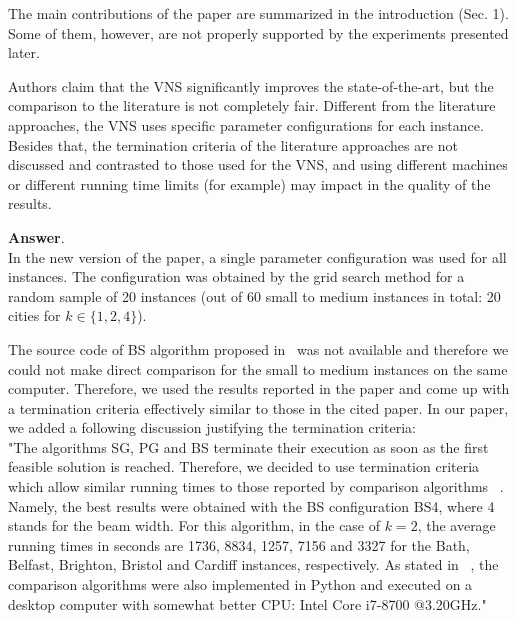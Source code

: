 \documentclass [11pt]{scrartcl}
\begin{document}
\begin{leftbar}
  
The main contributions of the paper are summarized in the introduction (Sec. 1). Some of them, however, are not properly supported by the experiments presented later.
\end{leftbar}
\begin{enumerate}
	\textbf{Answer}. \\
	In the new version of the paper, a single parameter configuration was used for all instances. The configuration was obtained by the grid search method for a random sample of 20 instances (out of 60 small to medium instances in total: 20 cities for $k \in \{1,2,4\}$).
	
	The source code of BS algorithm proposed in~\cite{corcoran2021heuristics} was not available and therefore we could not make direct comparison for the small to medium instances on the same computer. Therefore, we used the results reported in the paper and come up with a termination criteria effectively similar to those in the cited paper. 
	In our paper, we added a following discussion justifying the termination criteria:\\
	
	"The algorithms SG, PG and BS terminate their execution as soon as the first feasible solution is reached. Therefore, we decided to use termination criteria which allow similar running times to those reported by comparison algorithms ~\cite{corcoran2021heuristics}. Namely, the best results were obtained with the BS configuration BS4, where 4 stands for the beam width. For this algorithm, in the case of $k=2$, the average running times in seconds are 1736, 8834, 1257, 7156 and 3327 for the Bath, Belfast, Brighton, Bristol and Cardiff instances, respectively. As stated in ~\cite{corcoran2021heuristics}, the comparison algorithms were also implemented in  Python and executed on a desktop computer with somewhat better CPU: Intel Core i7-8700 @3.20GHz."
	

\end{enumerate}
\end{document}

